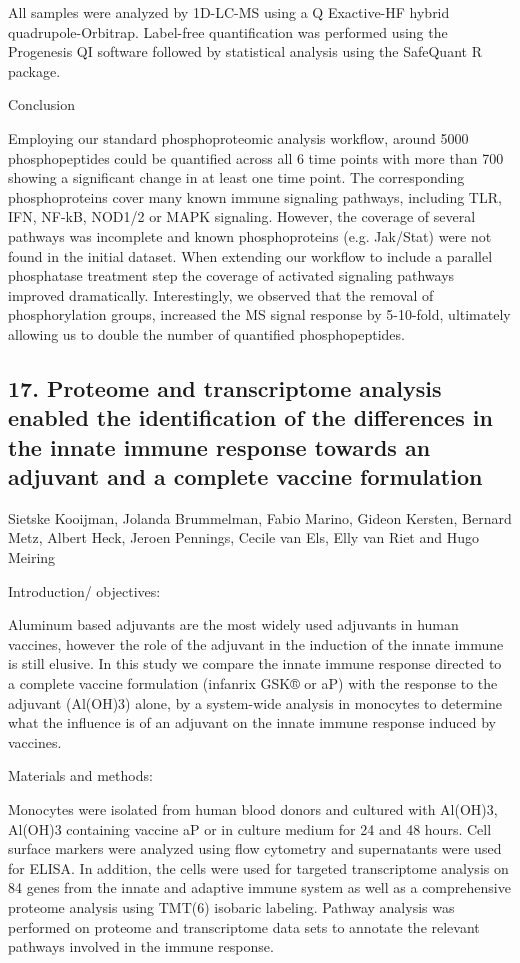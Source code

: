 All samples were analyzed by 1D-LC-MS using a Q Exactive-HF hybrid quadrupole-Orbitrap. Label-free quantification was performed using the Progenesis QI software followed by statistical analysis using the SafeQuant R package.


Conclusion

Employing our standard phosphoproteomic analysis workflow, around 5000 phosphopeptides could be quantified across all 6 time points with more than 700 showing a significant change in at least one time point. The corresponding phosphoproteins cover many known immune signaling pathways, including TLR, IFN, NF-kB, NOD1/2 or MAPK signaling. However, the coverage of several pathways was incomplete and known phosphoproteins (e.g. Jak/Stat) were not found in the initial dataset. When extending our workflow to include a parallel phosphatase treatment step the coverage of activated signaling pathways improved dramatically. Interestingly, we observed that the removal of phosphorylation groups, increased the MS signal response by 5-10-fold, ultimately allowing us to double the number of quantified phosphopeptides.

\subsection*{\color{eubicRed} 17. Proteome and transcriptome analysis enabled the identification of the differences in the innate immune response towards an adjuvant and a complete vaccine formulation}
{\color{eubicGray}Sietske Kooijman, Jolanda Brummelman, Fabio Marino, Gideon Kersten, Bernard Metz, Albert Heck, Jeroen Pennings, Cecile van Els, Elly van Riet and Hugo Meiring}

Introduction/ objectives:

Aluminum based adjuvants are the most widely used adjuvants in human vaccines, however the role of the adjuvant in the induction of the innate immune is still elusive. In this study we compare the innate immune response directed to a complete vaccine formulation (infanrix GSK® or aP) with the response to the adjuvant (Al(OH)3) alone, by a system-wide analysis in monocytes to determine what the influence is of an adjuvant on the innate immune response induced by vaccines.


Materials and methods:

Monocytes were isolated from human blood donors and cultured with Al(OH)3, Al(OH)3 containing vaccine aP or in culture medium for 24 and 48 hours. Cell surface markers were analyzed using flow cytometry and supernatants were used for ELISA. In addition, the cells were used for targeted transcriptome analysis on 84 genes from the innate and adaptive immune system as well as a comprehensive proteome analysis using TMT(6) isobaric labeling. Pathway analysis was performed on proteome and transcriptome data sets to annotate the relevant pathways involved in the immune response.


